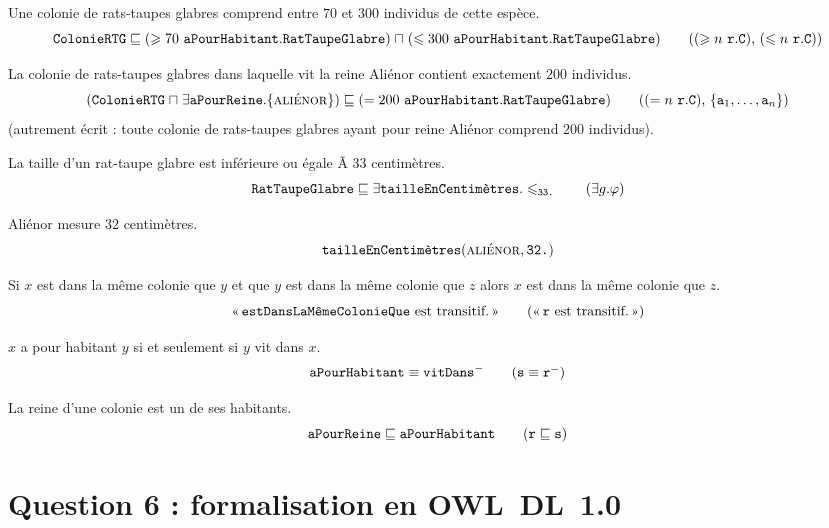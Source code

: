 \documentclass[11pt, a4paper]{article}
\def\fm#1{\text{\texttt{#1}}}
\def\roleR{\fm{r}}
\def\roleS{\fm{s}}
\def\instanceA{\fm{a}}
\def\conceptC{\fm{C}}
\def\attributG{g}
\def\subsumepar{\sqsubseteq}
\def\ET{\mathrel{\sqcap}}
\begin{document}
	Une colonie de rats-taupes glabres comprend entre $70$ et $300$ individus de cette espèce.
	\begin{equation*}
	\ColonieRTG \subsumepar
	(\geqslant 70 ~ \aPourHabitant . \RTG)
	\ET
	(\leqslant 300 ~ \aPourHabitant . \RTG)
	\tag{$(\geqslant n ~ \roleR . \conceptC)$, $(\leqslant n ~ \roleR . \conceptC)$}
	\end{equation*}
	
	La colonie de rats-taupes glabres dans laquelle vit la reine Aliénor
	contient exactement $200$ individus.
	\begin{equation*}
	(\ColonieRTG \ET \exists\aPourReine.\{\alienor\})
	\subsumepar
	(= 200 ~ \aPourHabitant . \RTG)
	\tag{$(= n ~ \roleR . \conceptC)$, $\{\instanceA_1, \ldots, \instanceA_n\}$}
	\end{equation*}
	(autrement écrit : toute colonie de rats-taupes glabres ayant pour
	reine Aliénor comprend $200$ individus).
	
	La taille d'un rat-taupe glabre est inférieure ou égale Ã  $33$ centimètres.
	\begin{equation*}
	\RTG
	\subsumepar
	\exists\tailleEnCentimetres.\leqslant_{\fm{33.}}
	\tag{$\exists\attributG.\varphi$}
	\end{equation*}
	
	Aliénor mesure $32$ centimètres.
	\begin{equation*}
	\tailleEnCentimetres(\alienor, \fm{32.})
	\end{equation*}
	
	Si $x$ est dans la même colonie que $y$ et que $y$ est dans la même colonie
	que $z$ alors $x$ est dans la même colonie que $z$.
	\begin{equation*}
	\text{<<\,$\estDansLaMemeColonieQue$ est transitif.\,>>}
	\tag{<<\,$\roleR$ est transitif.\,>>}
	\end{equation*}
	
	$x$ a pour habitant $y$ si et seulement si $y$ vit dans $x$.
	\begin{equation*}
	\aPourHabitant \equiv \vitDans^{-}
	\tag{$\roleS\equiv\roleR^{-}$}
	\end{equation*}
	
	La reine d'une colonie est un de ses habitants.
	\begin{equation*}
	\aPourReine \subsumepar \aPourHabitant
	\tag{$\roleR\subsumepar\roleS$}
	\end{equation*}
	
	\section*{Question 6 : formalisation en OWL~DL~1.0}
	
\end{document}
